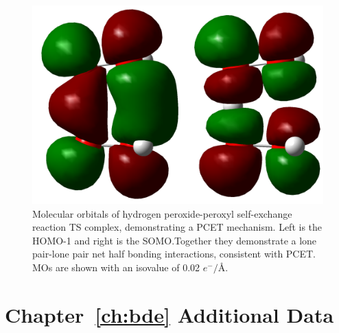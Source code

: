 \begin{figure}[H]
  \centering
  \includegraphics[width=\textwidth]{figures/hoohooh_TS.png}
  \caption[Molecular orbitals of hydrogen peroxide-peroxyl self-exchange reaction TS complex, demonstrating a PCET mechanism.]{Molecular orbitals of hydrogen peroxide-peroxyl self-exchange reaction TS complex, demonstrating a PCET mechanism. Left is the HOMO-1 and right is the SOMO.\@ Together they demonstrate a lone pair-lone pair net half bonding interactions, consistent with PCET. MOs are shown with an isovalue of 0.02 $e^-/$\AA.}
  \label{fig:hooh-ooh}
\end{figure}

\chapter{Chapter~\protect\ref{ch:bde} Additional Data}\label{ap:bde}

